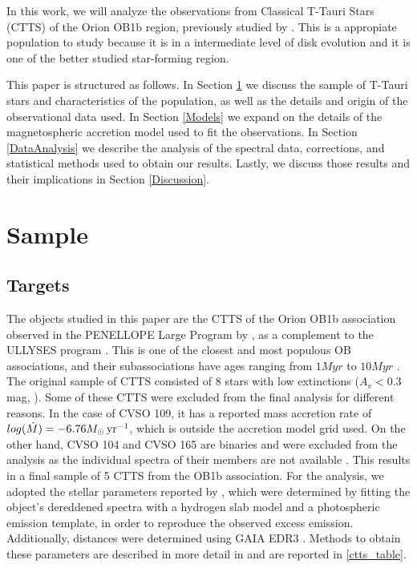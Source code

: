 \documentclass[twocolumn,linenumbers]{aastex631}
\newcommand{\msunyr}{M_{\sun} \, \rm{ yr^{-1}}}
\begin{document}
In this work, we will analyze the observations from  Classical T-Tauri Stars (CTTS) of the Orion OB1b region, previously studied by \citet{manara2021}. This is a appropiate population to study because it is in a intermediate level of disk evolution and it is one of the better studied star-forming region.

This paper is structured as follows. In Section \ref{Sample and observations} we discuss the sample of T-Tauri stars and characteristics of the population, as well as the details and origin of the observational data used. In Section \ref{Models} we expand on the details of the magnetospheric accretion model used to fit the observations. In Section \ref{DataAnalysis} we describe the analysis of the spectral data, corrections, and statistical methods used to obtain our results. Lastly, we discuss those results and their implications in Section \ref{Discussion}.



\section{Sample} \label{Sample and observations}

\subsection{Targets}
The objects studied in this paper are the CTTS of the Orion OB1b association observed in the PENELLOPE Large Program by \citep{manara2021}, as a complement to the ULLYSES program \citep{roman-duval2020}. This is one of the closest and most populous OB associations, and their subassociations have ages ranging from $1Myr$ to $10Myr$ \citep{blaauw1994}. The original sample of CTTS consisted of 8 stars with low extinctions ($A_v < 0.3$mag, \citet{briceno2019}). Some of these CTTS were excluded from the final analysis for different reasons. In the case of CVSO 109, it has a reported mass accretion rate of $log(\dot{M})= -6.76\msunyr$, which is outside the accretion model grid used. On the other hand, CVSO 104 and CVSO 165 are binaries and were excluded from the analysis as the individual spectra of their members are not available \citep{manara2021a}. This results in a final sample of 5 CTTS from the OB1b association. For the analysis, we adopted the stellar parameters reported by \citet{manara2021}, which were determined by fitting the object's dereddened spectra with a hydrogen slab model and a photospheric emission template, in order to reproduce the observed excess emission. Additionally, distances were determined using GAIA EDR3 \citep{gaia2016,gaia2021}. Methods to obtain these parameters are described in more detail in \citep{manara2013a} and are reported in \ref{ctts_table}. 
\end{document}
